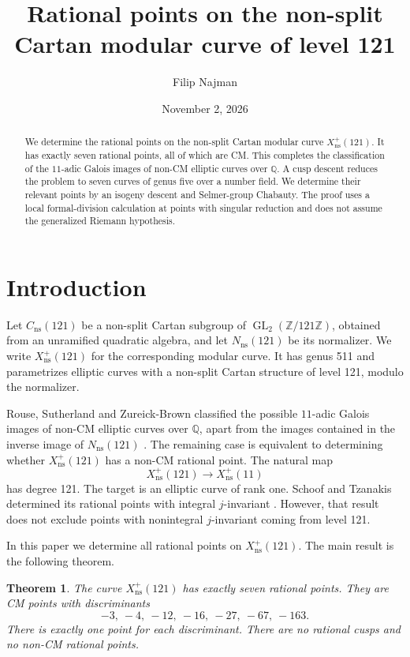 \documentclass[11pt,reqno]{amsart}
\title[Rational points on the non-split Cartan curve of level 121]{Rational points on the non-split Cartan modular curve of level 121}
\author{Filip Najman}
\date{November 2, 2026}
\newcommand{\Q}{\mathbb Q}\newcommand{\Z}{\mathbb Z}
\newcommand{\ns}{\mathrm{ns}}\newcommand{\GL}{\operatorname{GL}}
\newcommand{\Xns}[1]{X_{\ns}^{+}(#1)}
\newtheorem{theorem}{Theorem}[section]
\theoremstyle{definition}\newtheorem{definition}[theorem]{Definition}
\theoremstyle{remark}\newtheorem{remark}[theorem]{Remark}
\numberwithin{equation}{section}
\begin{document}
\begin{abstract}
We determine the rational points on the non-split Cartan modular curve
\(\Xns{121}\). It has exactly seven rational points, all of which are
CM. This completes the classification of the \(11\)-adic Galois images
of non-CM elliptic curves over \(\Q\). A cusp descent reduces the
problem to seven curves of genus five over a number field. We determine
their relevant points by an isogeny descent and Selmer-group Chabauty.
The proof uses a local formal-division calculation at points with
singular reduction and does not assume the generalized Riemann hypothesis.
\end{abstract}
\maketitle
\section{Introduction}

Let \(C_{\ns}(121)\) be a non-split Cartan subgroup of
\(\GL_2(\Z/121\Z)\), obtained from an unramified quadratic algebra,
and let \(N_{\ns}(121)\) be its normalizer. We write
\(\Xns{121}\) for the corresponding modular curve. It has genus
511 and parametrizes elliptic curves with a non-split Cartan
structure of level 121, modulo the normalizer.

Rouse, Sutherland and Zureick-Brown classified the possible
\(11\)-adic Galois images of non-CM elliptic curves over \(\Q\),
apart from the images contained in the inverse image of
\(N_{\ns}(121)\) \cite[Theorem 1.6]{RSZB}. The remaining case is
equivalent to determining whether \(\Xns{121}\) has a non-CM
rational point. The natural map
\[
 \Xns{121}\longrightarrow\Xns{11}
\]
has degree 121. The target is an elliptic curve of rank one.
Schoof and Tzanakis determined its rational points with integral
\(j\)-invariant \cite{ST}. However, that result does not exclude
points with nonintegral \(j\)-invariant coming from level 121.

In this paper we determine all rational points on \(\Xns{121}\).
The main result is the following theorem.

\begin{theorem}\label{thm:main}
The curve \(\Xns{121}\) has exactly seven rational points. They
are CM points with discriminants
\[
 -3,\ -4,\ -12,\ -16,\ -27,\ -67,\ -163.
\]
There is exactly one point for each discriminant. There are no
rational cusps and no non-CM rational points.
\end{theorem}
\end{document}
